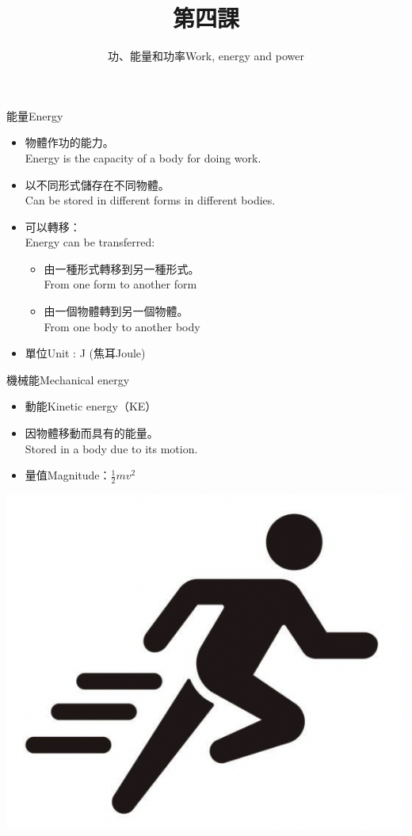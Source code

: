 \documentclass[beamer=true]{standalone}
\title{第四課}
\author{功、能量和功率Work, energy and power}
\institute{周末班}
\date{}
\begin{document}
\frame{\titlepage}


\begin{frame}{能量Energy}
    \begin{itemize}
        \item 物體作功的能力。\\Energy is the capacity of a body for doing work.
        \item 以不同形式儲存在不同物體。\\Can be stored in different forms in different bodies.
        \item 可以轉移：\\Energy can be transferred:
              \begin{itemize}
                  \item 由一種形式轉移到另一種形式。\\From one form to another form
                  \item 由一個物體轉到另一個物體。\\From one body to another body
              \end{itemize}
        \item 單位Unit : J (焦耳Joule)
    \end{itemize}
\end{frame}

\begin{frame}{機械能Mechanical energy}
    \begin{itemize}
        \item 動能Kinetic energy（KE）
        \item 因物體移動而具有的能量。\\Stored in a body due to its motion.
        \item 量值Magnitude：$\frac{1}{2}mv^2$
    \end{itemize}\bigskip
    {\par\centering
        \includegraphics[width=.3\textwidth]{assets/8ff24777.png}
        \par}
\end{frame}
\end{document}
